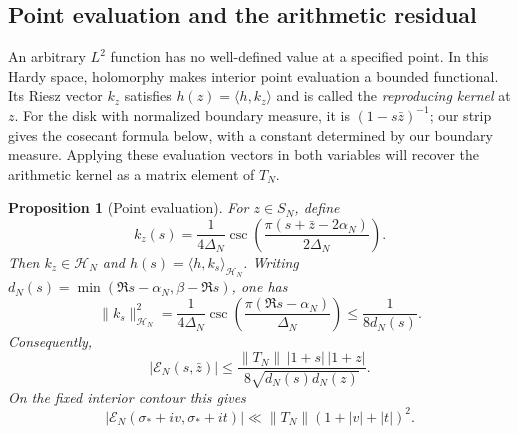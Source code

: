 \documentclass[12pt,a4paper]{amsart}
\numberwithin{equation}{section}
\def\le{\leqslant}
\theoremstyle{plain}
\newtheorem{proposition}{Proposition}[section]
\theoremstyle{definition}
\theoremstyle{remark}
\begin{document}
\subsection{Point evaluation and the arithmetic residual}

An arbitrary $L^2$ function has no well-defined value at a
specified point. In this Hardy space, holomorphy makes interior
point evaluation a bounded functional. Its Riesz vector $k_z$
satisfies $h(z)=\langle h,k_z\rangle$ and is called the
\emph{reproducing kernel} at $z$. For the disk with normalized
boundary measure, it is $(1-s\bar z)^{-1}$; our strip gives
the cosecant formula below, with a constant determined by our
boundary measure. Applying these evaluation vectors in both
variables will recover the arithmetic kernel as a matrix element
of $T_N$.

\begin{proposition}[Point evaluation]\label{proof:bd:evaluation}
For $z\in S_N$, define
\begin{equation}\label{hd:reproducing-kernel}
 k_z(s)=\frac1{4\Delta_N}
       \csc\!\left(\frac{\pi(s+\bar z-2\alpha_N)}{2\Delta_N}\right).
\end{equation}
Then $k_z\in\mathcal H_N$ and
$h(s)=\langle h,k_s\rangle_{\mathcal H_N}$.
Writing $d_N(s)=\min(\Re s-\alpha_N,\beta-\Re s)$,
one has
\begin{equation}\label{proof:hd:evaluation-norm}
 \|k_s\|_{\mathcal H_N}^2
 =\frac1{4\Delta_N}
       \csc\!\left(\frac{\pi(\Re s-\alpha_N)}{\Delta_N}\right)
 \le\frac1{8d_N(s)}.
\end{equation}
Consequently,
\begin{equation}\label{proof:bd:pointwise}
 |\mathscr E_N(s,\bar z)|\le
 \frac{\|T_N\|\,|1+s|\,|1+z|}
                       {8\sqrt{d_N(s)d_N(z)}}.
\end{equation}
On the fixed interior contour this gives
\begin{equation}\label{proof:bd:pointwise-fixed}
 |\mathscr E_N(\sigma_*+iv,\sigma_*+it)|
 \ll\|T_N\|(1+|v|+|t|)^2.
\end{equation}
\end{proposition}
\end{document}
